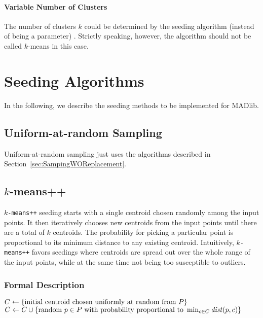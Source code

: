 \paragraph{Variable Number of Clusters}

The number of clusters $k$ could be determined by the seeding algorithm (instead of being a parameter) \cite{MNU00a}. Strictly speaking, however, the algorithm should not be called $k$-means in this case.


\section{Seeding Algorithms}

In the following, we describe the seeding methods to be implemented for MADlib.

\subsection{Uniform-at-random Sampling}

Uniform-at-random sampling just uses the algorithms described in Section~\ref{sec:SampingWOReplacement}.

\subsection[k-means++]{$k$-means++}

\texttt{$k$-means++} seeding \cite{AV07a} starts with a single centroid chosen randomly among the input points. It then iteratively chooses new centroids from the input points until there are a total of $k$ centroids. The probability for picking a particular point is proportional to its minimum distance to any existing centroid. Intuitively, \texttt{$k$-means++} favors seedings where centroids are spread out over the whole range of the input points, while at the same time not being too susceptible to outliers.

\subsubsection{Formal Description}

\begin{algorithm} \label{alg:kmeans++}
\begin{algorithmic}[1]
		\State $C \leftarrow \{ \text{initial centroid chosen uniformly at random from } P \}$ \label{alg:kmeanspp:firstCentroid}
	\EndIf
	 \label{alg:kmeans++:for}
		\State $C \leftarrow C \cup \{ \text{random $p \in P$ with probability proportional to }\min_{c \in C} \mathit{dist}(p,c) \}$ \label{alg:kmeanspp:nextcentroid}
	\EndWhile
\end{algorithmic}
\end{algorithm}

